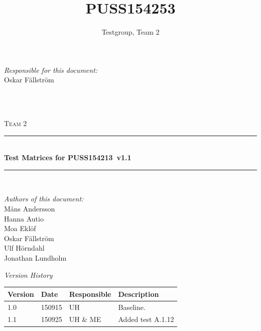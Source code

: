 \documentclass[a4paper]{article}
\title{PUSS154253}
\author{Testgroup, Team 2}
\newcommand{\SVVS}{PUSS154213}
\begin{document}
\begin{titlepage}
\newcommand{\HRule}{\rule{\linewidth}{0.5mm}}

\begin{minipage}{0.5\textwidth}
\begin{flushleft} %
\textit{Responsible for this document:}\\
Oskar Fällström %
\end{flushleft}
\end{minipage}
~
\begin{minipage}{0.4\textwidth}
\begin{flushright}
\title  %
\today
\end{flushright}
\end{minipage}\\[3cm]

\centering
\textsc{\LARGE Team 2}\\[0.5cm]

\HRule \\[0.4cm]
{ \huge \bfseries Test Matrices for \SVVS\ v1.1 }\\[0.4cm] %
\HRule \\[1.5cm]

\vfill
\begin{flushleft}
\textit{Authors of this document:}\\
Måns Andersson \\
Hanna Autio \\
Moa Eklöf \\
Oskar Fällström \\
Ulf Hörndahl \\
Jonathan Lundholm
\end{flushleft}


\end{titlepage}

\begin{center}
\textit{\large Version History}

    \begin{tabular}{ | l | l | l | p{5cm} |}
    \hline
    \textbf{Version} 	& \textbf{Date} 	& \textbf{Responsible} 	& \textbf{Description} 		\\ \hline
    1.0				 	& 150915 			& UH 					&  Baseline. 				\\ \hline
    1.1					& 150925			& UH \& ME			&  Added test A.1.12 \\ \hline
    \end{tabular}
\end{center}
\end{document}
